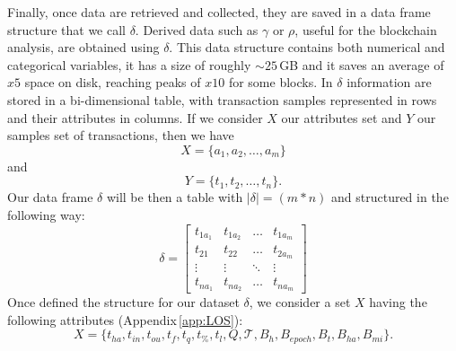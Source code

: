 \documentclass[USenglish]{uit-thesis}
\begin{document}
Finally, once data are
retrieved and collected, they are saved in a data frame
structure that we call $\delta$.
Derived data such as $\gamma$ or $\rho$,
useful for the blockchain analysis, are obtained using $\delta$.
This data structure contains
both numerical and categorical variables, it has a
size of roughly $\sim$$25$\,GB and it saves an average
of $x5$ space on disk, reaching peaks of $x10$ for some blocks.
In $\delta$ information are stored in a bi-dimensional table,
with transaction samples represented in
rows and their attributes in columns.
If we consider $X$ our attributes set and $Y$ our samples set
of transactions, then we have
\[
X = \{ a_1, a_2, \dots, a_m \}
\]
and
\[
Y = \{ t_1, t_2, \dots, t_n \}.
\]
Our data frame $\delta$ will be then a table with $|\delta| = (m * n)$
and structured in the following way:
\begin{equation}
\label{eq:dataframe}
\delta = \begin{bmatrix}
t_{1a_1} & t_{1a_2}  & \dots & t_{1a_m}\\
t_{21} & t_{22} & \dots & t_{2a_m}\\
\vdots & \vdots & \ddots& \vdots\\
t_{na_1} & t_{na_2} & \dots & t_{na_m}
\end{bmatrix}
\end{equation}
Once defined the structure for our dataset $\delta$,
we consider a set $X$ having the following
attributes (Appendix\,\ref{app:LOS}):
\[
X = \{ t_{ha}, t_{in}, t_{ou}, t_f, t_q, t_\%, t_l, Q, \mathcal{T}, B_h, B_{epoch}, B_t, B_{ha}, B_{mi} \}.
\]




\end{document}
